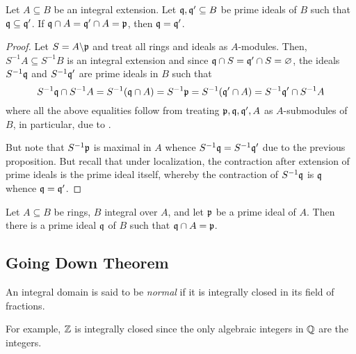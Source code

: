 \begin{proposition}
    Let $A\subseteq B$ be an integral extension. Let $\mathfrak q,\mathfrak q'\subseteq B$ be prime ideals of $B$ such that $\mathfrak q\subseteq\mathfrak q'$. If $\mathfrak q\cap A = \mathfrak q'\cap A = \mathfrak p$, then $\mathfrak q = \mathfrak q'$.
\end{proposition}
\begin{proof}
    Let $S = A\backslash\mathfrak p$ and treat all rings and ideals as $A$-modules. Then, $S^{-1}A\subseteq S^{-1}B$ is an integral extension and since $\mathfrak q\cap S = \mathfrak q'\cap S = \varnothing$, the ideals $S^{-1}\mathfrak q$ and $S^{-1}\mathfrak q'$ are prime ideals in $B$ such that 
    \begin{equation*}
        S^{-1}\mathfrak q\cap S^{-1}A = S^{-1}(\mathfrak q\cap A) = S^{-1}\mathfrak p = S^{-1}(\mathfrak q'\cap A) = S^{-1}\mathfrak q'\cap S^{-1}A
    \end{equation*}
    where all the above equalities follow from treating $\mathfrak p,\mathfrak q,\mathfrak q',A$ as $A$-submodules of $B$, in particular, due to .

    But note that $S^{-1}\mathfrak p$ is maximal in $A$ whence $S^{-1}\mathfrak q = S^{-1}\mathfrak q'$ due to the previous proposition. But recall that under localization, the contraction after extension of prime ideals is the prime ideal itself, whereby the contraction of $S^{-1}\mathfrak q$ is $\mathfrak q$ whence $\mathfrak q = \mathfrak q'$.
\end{proof}

\begin{lemma}
    Let $A\subseteq B$ be rings, $B$ integral over $A$, and let $\mathfrak p$ be a prime ideal of $A$. Then there is a prime ideal $\mathfrak q$ of $B$ such that $\mathfrak q\cap A = \mathfrak p$.
\end{lemma}

\subsection{Going Down Theorem}

\begin{definition}
    An integral domain is said to be \textit{normal} if it is integrally closed in its field of fractions.
\end{definition}

For example, $\mathbb{Z}$ is integrally closed since the only algebraic integers in $\mathbb{Q}$ are the integers.

